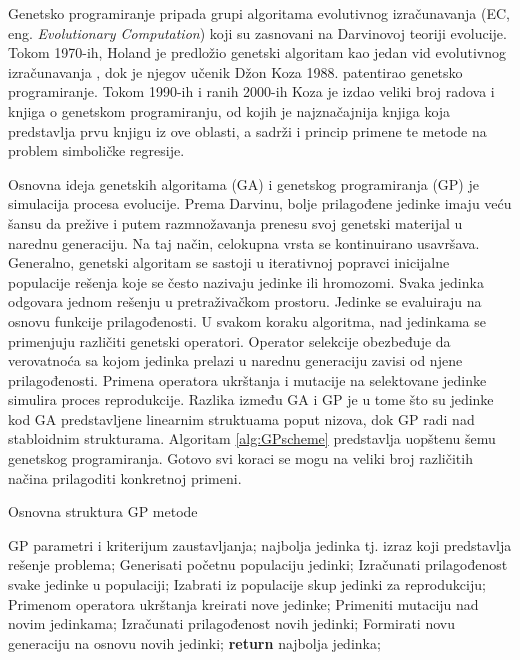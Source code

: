\documentclass[main.tex]{subfiles}
\begin{document}
Genetsko programiranje pripada grupi algoritama evolutivnog izračunavanja (EC, eng. \textit{Evolutionary Computation}) koji su zasnovani na Darvinovoj teoriji evolucije. Tokom 1970-ih, Holand je predložio genetski algoritam kao jedan vid evolutivnog izračunavanja \cite{holland}, dok je njegov učenik Džon Koza 1988. patentirao genetsko programiranje. Tokom 1990-ih i ranih 2000-ih Koza je izdao veliki broj radova i knjiga o genetskom programiranju, od kojih je najznačajnija knjiga \cite{koza} koja predstavlja prvu knjigu iz ove oblasti, a sadrži i princip primene te metode na problem simboličke regresije.

Osnovna ideja genetskih algoritama (GA) i genetskog programiranja (GP) je simulacija procesa evolucije. Prema Darvinu, bolje prilagođene jedinke imaju veću šansu da prežive i putem razmnožavanja prenesu svoj genetski materijal u narednu generaciju. Na taj način, celokupna vrsta se kontinuirano usavršava. Generalno, genetski algoritam se sastoji u iterativnoj popravci inicijalne populacije rešenja koje se često nazivaju jedinke ili hromozomi. Svaka jedinka odgovara jednom rešenju u pretraživačkom prostoru. Jedinke se evaluiraju na osnovu funkcije prilagođenosti. U svakom koraku algoritma, nad jedinkama se primenjuju različiti genetski operatori. Operator selekcije obezbeđuje da verovatnoća sa kojom jedinka prelazi u narednu generaciju zavisi od njene prilagođenosti. Primena operatora ukrštanja i mutacije na selektovane jedinke simulira proces reprodukcije. Razlika između GA i GP je u tome što su jedinke kod GA predstavljene linearnim struktuama poput nizova, dok GP radi nad stabloidnim strukturama. Algoritam \autoref{alg:GPscheme} predstavlja uopštenu šemu genetskog programiranja. Gotovo svi koraci se mogu na veliki broj različitih načina prilagoditi konkretnoj primeni.

\begin{algorithm}
\caption{Osnovna struktura GP metode}
\label{alg:GPscheme}
  \begin{algorithmic}[1]
    \INPUT GP parametri i kriterijum zaustavljanja;
    \OUTPUT najbolja jedinka tj. izraz koji predstavlja rešenje problema;
    \STATE Generisati početnu populaciju jedinki;
    \STATE Izračunati prilagođenost svake jedinke u populaciji;
      \STATE Izabrati iz populacije skup jedinki za reprodukciju;
      \STATE Primenom operatora ukrštanja kreirati nove jedinke;
        \STATE Primeniti mutaciju nad novim jedinkama;
      \ENDIF
      \STATE Izračunati prilagođenost novih jedinki;
      \STATE Formirati novu generaciju na osnovu novih jedinki;
    \ENDWHILE
    \STATE \textbf{return} najbolja jedinka;
  \end{algorithmic}
\end{algorithm}
\end{document}
